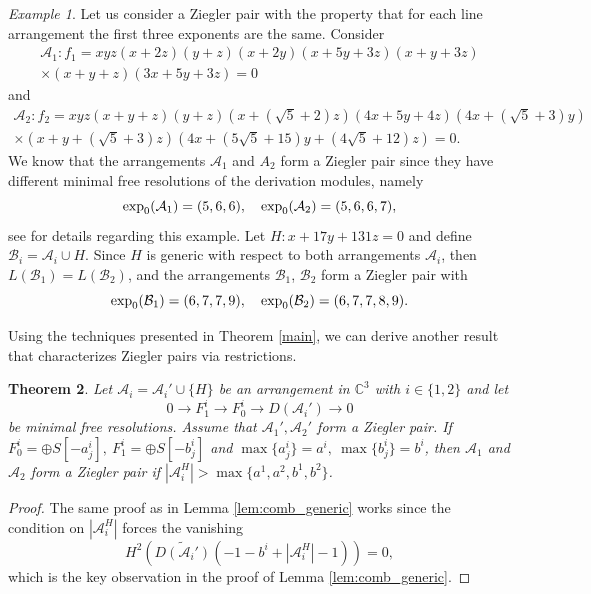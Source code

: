 \documentclass[a4paper,11pt]{amsart}
\def\CC{{\mathbb{C}}}%
\def\C{{\mathbb{C}}}%
\def\A{{\mathcal{A}}}%
\def\C{{\mathcal{C}}}%
\numberwithin{equation}{section}
\newtheorem{theorem}{Theorem}[section]
\theoremstyle{remark}
\newtheorem{example}[theorem]{Example}
\begin{document}
\begin{example}
Let us consider a Ziegler pair with the property that for each line arrangement the first three exponents are the same. Consider 
\begin{multline*}
\mathcal{A}_{1} : f_{1}=xyz(x+2z)(y+z)(x+2y)(x+5y+3z)(x+y+3z)\\ \times (x+y+z)(3x+5y+3z)=0   
\end{multline*}
and 
\begin{multline*}
\mathcal{A}_{2} : f_{2}=xyz(x+y+z)(y+z)(x+(\sqrt{5}+2)z)(4x+5y+4z)(4x+(\sqrt{5}+3)y) \\ \times (x+y+(\sqrt{5}+3)z)(4x+(5\sqrt{5}+15)y+(4\sqrt{5}+12)z)=0.   
\end{multline*}
We know that the arrangements $\mathcal{A}_{1}$ and $A_{2}$ form a Ziegler pair since they have different minimal free resolutions of the derivation modules, namely
$${\rm exp}_{0}(\mathcal{A}_{1}) = (5,6,6), \quad {\rm exp}_{0}(\mathcal{A}_{2}) = (5,6,6,7),$$
see \cite{CP} for details regarding this example.
Let $H : x+17y+131z = 0$ and define $\mathcal{B}_{i} = \mathcal{A}_{i} \cup H$. Since $H$ is generic with respect to both arrangements $\mathcal{A}_{i}$, then $L(\mathcal{B}_{1}) = L(\mathcal{B}_{2})$, and the arrangements $\mathcal{B}_{1}$, $\mathcal{B}_{2}$ form a Ziegler pair with
$${\rm exp}_{0}(\mathcal{B}_{1}) = (6,7,7,9), \quad {\rm exp}_{0}(\mathcal{B}_{2}) = (6,7,7,8,9).$$
\end{example}
Using the techniques presented in Theorem \ref{main}, we can derive another result that characterizes Ziegler pairs via restrictions.
\begin{theorem}
Let $\A_i=\A_i' \cup \{H\}$ be an arrangement in $\CC^3$ with $i \in \{1,2\}$ and let 
$$
0 \rightarrow F_1^i \rightarrow F_0^i \rightarrow D(\A_i') \rightarrow 0
$$
be minimal free resolutions. Assume that $\A_1',\A_2'$ form a Ziegler pair. If $
F_0^i=\oplus S[-a_j^i],\ 
F_1^i=\oplus S[-b_j^i]$ and 
$\max \{a_j^i\}=a^i,\ \max \{b_j^i\}=b^i$, then $\A_1$ and $\A_2$ form a Ziegler pair if 
$|\A_i^{H}|>\max\{a^1,a^2,b^1,b^2\} $.
\label{genzpC3}
\end{theorem}

\begin{proof}
 The same proof as in Lemma \ref{lem:comb_generic} works since the condition on $|\A_i^{H}|$ forces the vanishing
$$
H^2(\widetilde{D(\A_i')}(-1-b^i+|\A_i^{H}|-1))=0,
$$
which is the key observation in the proof of Lemma \ref{lem:comb_generic}.
\end{proof}
\end{document}
